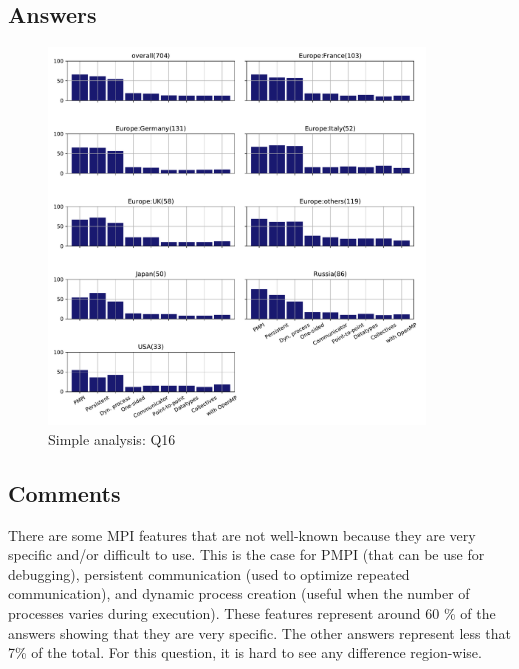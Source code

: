 
\subsection{Answers}



\begin{figure}[htb]
\begin{center}
\includegraphics[width=10cm]{../pdfs/Q16.pdf}
\caption{Simple analysis: Q16}
\label{fig:Q16}
\end{center}
\end{figure}

\subsection{Comments}

There are some MPI features that are not well-known because they are very
specific and/or difficult to use. This is the case for PMPI (that can be use for
debugging), persistent communication (used to optimize repeated communication),
and dynamic process creation (useful when the number of processes varies during
execution). These features represent around  60 \% of the answers showing that
they are very specific. The other answers represent less that 7\% of the
total.  For this question, it is hard to see any difference region-wise.
